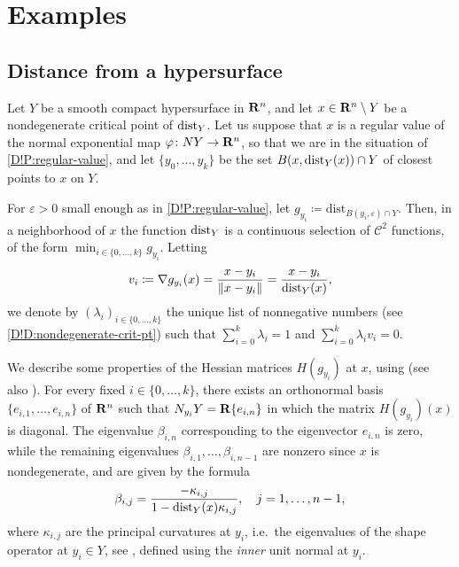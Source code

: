 \section{Examples}

\subsection{Distance from a hypersurface}
\label{D!subsec:disthyper}

Let $Y$ be a smooth compact hypersurface in $\mathbf{R}^n$, and let $x\in \mathbf{R}^n \setminus Y$ be a nondegenerate critical point of $\operatorname{dist}_Y$. Let us suppose that $x$ is a regular value of the normal exponential map $\varphi \colon NY \to \mathbf{R}^n$, so that we are in the situation of \cref{D!P:regular-value}, and let $\{y_0, \ldots, y_k\}$ be the set $B(x, \operatorname{dist}_Y(x)) \cap Y$ of closest points to $x$ on $Y$. 

For $\varepsilon >0$ small enough as in \cref{D!P:regular-value}, let $g_{y_i} \coloneq \text{dist}_{B(y_i, \varepsilon) \cap Y}$.
Then, in a neighborhood of $x$ the function $\operatorname{dist}_Y$ is a continuous selection of $\mathcal{C}^2$ functions, of the form $\min_{i\in \{0,\ldots ,k\} } g_{y_i}$. Letting 
\begin{equation}
  \label{D!eq:vi}
  v_i \coloneq \nabla g_{y_i} (x) = \frac{x-y_i}{\| x-y_i \|} = \frac{x-y_i}{\operatorname{dist}_Y (x)},
\end{equation}
we denote by $(\lambda_i)_{i\in \{0,\ldots ,k\}}$ the unique list of nonnegative numbers (see \cref{D!D:nondegenerate-crit-pt}) such that $\sum_{i=0}^k \lambda_i =1$ and $\sum_{i=0}^k \lambda_i v_i=0$. 

We describe some properties of the Hessian matrices $H(g_{y_i})$ at $x$, using \cite[Theorem~3.2]{ambrosio1996level} (see also \cite[Section~3]{Mantegazza2010}).
For every fixed $i\in\{0,\ldots,k\}$, there exists an orthonormal basis $\{e_{i,1}, \ldots , e_{i,n}\}$ of $\mathbf{R}^n$ such that $N_{y_i}Y = \mathbf{R} \{e_{i,n}\}$ in which the matrix $H(g_{y_i})(x)$ is diagonal. The eigenvalue $\beta_{i,n}$ corresponding to the eigenvector $e_{i,n}$ is zero, while the remaining eigenvalues $\beta_{i,1},\ldots ,\beta_{i,n-1}$ are nonzero since $x$ is nondegenerate, and are given by the formula
\begin{equation}
\label{D!eq:betaij}
  \beta_{i,j} = \frac{-\kappa_{i,j}}{1 - \operatorname{dist}_Y(x)\kappa_{i,j}}, \quad j=1,\ldots ,n-1,
\end{equation}
where $\kappa_{i,j}$ are the principal curvatures at $y_i$, i.e.\ the eigenvalues of the shape operator at $y_i \in Y$, see \cite[Chapter 8]{Lee1997}, defined using the \textit{inner} unit normal at $y_i$.

